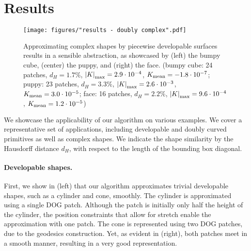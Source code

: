 
\section{Results} 
\label{sec:results}




\begin{figure*} 
    \centering
    \noindent\texttt{[image: figures/"results - doubly complex".pdf]}
    \caption{
        Approximating complex shapes by piecewise developable surfaces results in a sensible abstraction, as showcased by (left) the bumpy cube, (center) the puppy, and (right) the face.
        (bumpy cube: 24 patches, $d_H = 1.7\%$, $ \left\vert K\right\vert_\text{max} = 2.9\cdot 10^{-4} $, $ K_\text{mean} = -1.8\cdot 10^{-7} $; 
        puppy: 23 patches, $d_H = 3.3\%$, $ \left\vert K\right\vert_\text{max} = 2.6\cdot 10^{-3} $, $ K_\text{mean} = 3.0\cdot 10^{-5} $; 
        face: 16 patches, $d_H = 2.2\%$, $ \left\vert K\right\vert_\text{max} = 9.6\cdot 10^{-4} $, $ K_\text{mean} = 1.2\cdot 10^{-5} $)
    \label{fig:results_complex}}
\end{figure*}


We showcase the applicability of our algorithm on various examples. 
We cover a representative set of applications, including developable and doubly curved primitives as well as complex shapes.
We indicate the shape similarity by the Hausdorff distance $d_H$, with respect to the length of the bounding box diagonal. 


\paragraph{Developable shapes. }

First, we show in  (left) that our algorithm approximates trivial developable shapes, such as a cylinder and cone, smoothly. The cylinder is approximated using a single DOG patch. Although the patch is initially only half the height of the cylinder, the position constraints that allow for stretch enable the approximation with one patch. The cone is represented using two DOG patches, due to the geodesics construction. Yet, as evident in  (right), both patches meet in a smooth manner, 
resulting in a very good representation.

